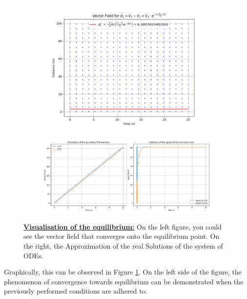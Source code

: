 \documentclass{article}
\begin{document}
	
	\begin{figure}[H]
		\centering
		\begin{subfigure}{0.40\textwidth}
			\centering
			\includegraphics[width=\linewidth]{VectorFIeld.png}
		\end{subfigure}
		\hfill
		\begin{subfigure}{0.55\textwidth}
			\centering
			\includegraphics[width=\linewidth]{RealSol.png}
		\end{subfigure}
		\caption[Visualisation of the equilibrium]{\textbf{\underline{Visualisation of the equilibrium:}} On the left figure, you could see the vector field that converges onto the equilibrium point. On the right, the Approximation of the real Solutions of the system of ODEs.}
		\label{fig:SE3}
	\end{figure}
	
		Graphically, this can be observed in Figure \ref{fig:SE3}. On the left side of the figure, the phenomenon of convergence towards equilibrium can be demonstrated when the previously performed conditions are adhered to.
	
\end{document}
